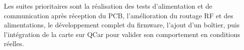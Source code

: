 \documentclass[10pt,a4paper]{article}
\begin{document}
Les suites prioritaires sont la r\'ealisation des tests d'alimentation et de communication apr\`es r\'eception du PCB, l'am\'elioration du routage RF et des alimentations, le d\'eveloppement complet du firmware, l'ajout d'un bo\^itier, puis l'int\'egration de la carte sur QCar pour valider son comportement en conditions r\'eelles.

\vspace{2mm}
\begin{center}
\end{center}
\end{document}
